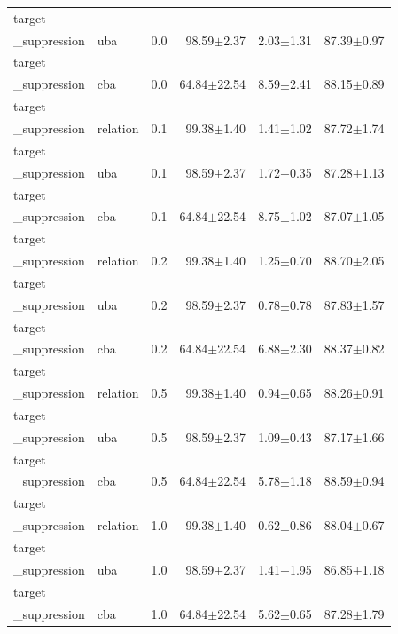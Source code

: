 \begin{table}[t]
\begin{tabular}{llrrrr}
target\\_suppression & uba & 0.0 & 98.59$\pm$2.37 & 2.03$\pm$1.31 & 87.39$\pm$0.97 \\
target\\_suppression & cba & 0.0 & 64.84$\pm$22.54 & 8.59$\pm$2.41 & 88.15$\pm$0.89 \\
target\\_suppression & relation & 0.1 & 99.38$\pm$1.40 & 1.41$\pm$1.02 & 87.72$\pm$1.74 \\
target\\_suppression & uba & 0.1 & 98.59$\pm$2.37 & 1.72$\pm$0.35 & 87.28$\pm$1.13 \\
target\\_suppression & cba & 0.1 & 64.84$\pm$22.54 & 8.75$\pm$1.02 & 87.07$\pm$1.05 \\
target\\_suppression & relation & 0.2 & 99.38$\pm$1.40 & 1.25$\pm$0.70 & 88.70$\pm$2.05 \\
target\\_suppression & uba & 0.2 & 98.59$\pm$2.37 & 0.78$\pm$0.78 & 87.83$\pm$1.57 \\
target\\_suppression & cba & 0.2 & 64.84$\pm$22.54 & 6.88$\pm$2.30 & 88.37$\pm$0.82 \\
target\\_suppression & relation & 0.5 & 99.38$\pm$1.40 & 0.94$\pm$0.65 & 88.26$\pm$0.91 \\
target\\_suppression & uba & 0.5 & 98.59$\pm$2.37 & 1.09$\pm$0.43 & 87.17$\pm$1.66 \\
target\\_suppression & cba & 0.5 & 64.84$\pm$22.54 & 5.78$\pm$1.18 & 88.59$\pm$0.94 \\
target\\_suppression & relation & 1.0 & 99.38$\pm$1.40 & 0.62$\pm$0.86 & 88.04$\pm$0.67 \\
target\\_suppression & uba & 1.0 & 98.59$\pm$2.37 & 1.41$\pm$1.95 & 86.85$\pm$1.18 \\
target\\_suppression & cba & 1.0 & 64.84$\pm$22.54 & 5.62$\pm$0.65 & 87.28$\pm$1.79 \\
\bottomrule
\end{tabular}
\end{table}
